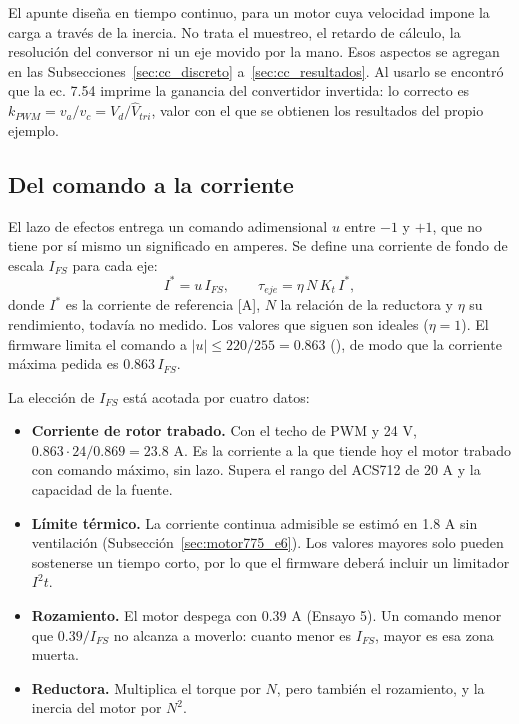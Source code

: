 El apunte diseña en tiempo continuo, para un motor cuya velocidad impone la carga a través de la inercia. No trata el muestreo, el retardo de cálculo, la resolución del conversor ni un eje movido por la mano. Esos aspectos se agregan en las Subsecciones~\ref{sec:cc_discreto} a~\ref{sec:cc_resultados}. Al usarlo se encontró que la ec. 7.54 imprime la ganancia del convertidor invertida: lo correcto es $k_{PWM} = v_a/v_c = V_d/\hat V_{tri}$, valor con el que se obtienen los resultados del propio ejemplo.

\subsection{Del comando a la corriente}
\label{sec:cc_escala}
El lazo de efectos entrega un comando adimensional $u$ entre $-1$ y $+1$, que no tiene por sí mismo un significado en amperes. Se define una corriente de fondo de escala $I_{FS}$ para cada eje:
\begin{equation}
I^* = u\,I_{FS},\qquad \tau_{eje} = \eta\,N\,K_t\,I^*,
\label{eq:cc_escala}
\end{equation}
donde $I^*$ es la corriente de referencia [A], $N$ la relación de la reductora y $\eta$ su rendimiento, todavía no medido. Los valores que siguen son ideales ($\eta = 1$). El firmware limita el comando a $|u| \leq 220/255 = 0.863$ (), de modo que la corriente máxima pedida es $0.863\,I_{FS}$.

La elección de $I_{FS}$ está acotada por cuatro datos:
\begin{itemize}
\item \textbf{Corriente de rotor trabado.} Con el techo de PWM y 24 V, $0.863\cdot 24/0.869 = 23.8$ A. Es la corriente a la que tiende hoy el motor trabado con comando máximo, sin lazo. Supera el rango del ACS712 de 20 A y la capacidad de la fuente.
\item \textbf{Límite térmico.} La corriente continua admisible se estimó en 1.8 A sin ventilación (Subsección~\ref{sec:motor775_e6}). Los valores mayores solo pueden sostenerse un tiempo corto, por lo que el firmware deberá incluir un limitador $I^2t$.
\item \textbf{Rozamiento.} El motor despega con 0.39 A (Ensayo 5). Un comando menor que $0.39/I_{FS}$ no alcanza a moverlo: cuanto menor es $I_{FS}$, mayor es esa zona muerta.
\item \textbf{Reductora.} Multiplica el torque por $N$, pero también el rozamiento, y la inercia del motor por $N^2$.
\end{itemize}

